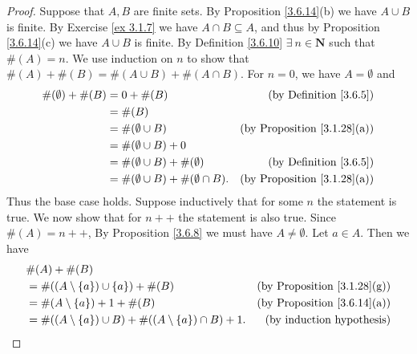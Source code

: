 \begin{proof}
    Suppose that \(A, B\) are finite sets.
    By Proposition \ref{3.6.14}(b) we have \(A \cup B\) is finite.
    By Exercise \ref{ex 3.1.7} we have \(A \cap B \subseteq A\), and thus by Proposition \ref{3.6.14}(c) we have \(A \cup B\) is finite.
    By Definition \ref{3.6.10} \(\exists\ n \in \mathbf{N}\) such that \(\#(A) = n\).
    We use induction on \(n\) to show that \(\#(A) + \#(B) = \#(A \cup B) + \#(A \cap B)\).
    For \(n = 0\), we have \(A = \emptyset\) and
    \begin{align*}
        \#(\emptyset) + \#(B) & = 0 + \#(B)                                    & \text{(by Definition \ref{3.6.5})}      \\
                              & = \#(B)                                                                                  \\
                              & = \#(\emptyset \cup B)                         & \text{(by Proposition \ref{3.1.28}(a))} \\
                              & = \#(\emptyset \cup B) + 0                                                               \\
                              & = \#(\emptyset \cup B) + \#(\emptyset)         & \text{(by Definition \ref{3.6.5})}      \\
                              & = \#(\emptyset \cup B) + \#(\emptyset \cap B). & \text{(by Proposition \ref{3.1.28}(a))}
    \end{align*}
    Thus the base case holds.
    Suppose inductively that for some \(n\) the statement is true.
    We now show that for \(n++\) the statement is also true.
    Since \(\#(A) = n++\), By Proposition \ref{3.6.8} we must have \(A \neq \emptyset\).
    Let \(a \in A\).
    Then we have
    \begin{align*}
         & \#(A) + \#(B)                                                                                                    \\
         & = \#((A \setminus \{a\}) \cup \{a\}) + \#(B)                           & \text{(by Proposition \ref{3.1.28}(g))} \\
         & = \#(A \setminus \{a\}) + 1 + \#(B)                                    & \text{(by Proposition \ref{3.6.14}(a))} \\
         & = \#((A \setminus \{a\}) \cup B) + \#((A \setminus \{a\}) \cap B) + 1. & \text{(by induction hypothesis)}
    \end{align*}

\end{proof}
